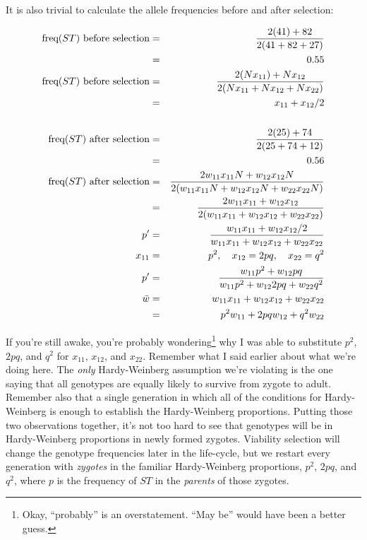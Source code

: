 It is also trivial to calculate the allele frequencies before and
after selection:

\begin{eqnarray*}
\hbox{freq($ST$) before selection}
 &=& \frac{2(41) + 82}{2(41 + 82 + 27)} \\
 &=& 0.55 \\
\hbox{freq($ST$) before selection}
 &=& \frac{2(Nx_{11}) + Nx_{12}}{2(Nx_{11} + Nx_{12} + Nx_{22})} \\
 &=& x_{11} + x_{12}/2 \\
&& \\
\hbox{freq($ST$) after selection}
 &=& \frac{2(25) + 74}{2(25 + 74 + 12)} \\
 &=& 0.56 \\
\hbox{freq($ST$) after selection}
 &=& \frac{2w_{11}x_{11}N + w_{12}x_{12}N}{2(w_{11}x_{11}N + w_{12}x_{12}N + w_{22}x_{22}N)} \\
 &=& \frac{2w_{11}x_{11} + w_{12}x_{12}}{2(w_{11}x_{11} + w_{12}x_{12} + w_{22}x_{22})} \\
p' &=& \frac{w_{11}x_{11} + w_{12}x_{12}/2}{w_{11}x_{11} +
 w_{12}x_{12} + w_{22}x_{22}} \\
x_{11} &=& p^2, \quad x_{12} = 2pq, \quad x_{22} = q^2 \\
p' &=& \frac{w_{11}p^2 + w_{12}pq}{w_{11}p^2 + w_{12}2pq + w_{22}q^2} \\
\bar w &=& w_{11}x_{11} + w_{12}x_{12} + w_{22}x_{22} \\
       &=& p^2w_{11} + 2pqw_{12} + q^2w_{22}
\end{eqnarray*}

If you're still awake, you're probably wondering\footnote{Okay,
  ``probably'' is an overstatement. ``May be'' would have been a
  better guess.} why I was able to substitute $p^2$, $2pq$, and $q^2$
for $x_{11}$, $x_{12}$, and $x_{22}$. Remember what I said earlier
about what we're doing here. The {\it only\/} Hardy-Weinberg
assumption we're violating is the one saying that all genotypes are
equally likely to survive from zygote to adult. Remember also that a
single generation in which all of the conditions for Hardy-Weinberg is
enough to establish the Hardy-Weinberg proportions. Putting those two
observations together, it's not too hard to see that genotypes will be
in Hardy-Weinberg proportions in newly formed zygotes. Viability
selection will change the genotype frequencies later in the
life-cycle, but we restart every generation with {\it zygotes\/} in
the familiar Hardy-Weinberg proportions, $p^2$, $2pq$, and $q^2$,
where $p$ is the frequency of $ST$ in the {\it parents\/} of those
zygotes.

